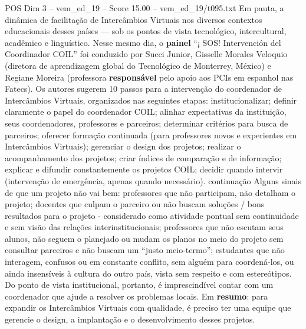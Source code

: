 \begin{textsample}{POS Dim 3 – vem\_ed\_19 – Score 15.00 – vem\_ed\_19/t095.txt}
Em pauta, a dinâmica de facilitação de Intercâmbios Virtuais nos diversos contextos educacionais desses países — sob os pontos de vista tecnológico, intercultural, acadêmico e linguístico.
Nesse mesmo dia, o \textbf{painel} “¡ SOS!
Intervención del Coordinador COIL” foi conduzido por Succi Junior, Gisselle Morales Veloquio (diretora de aprendizagem global do Tecnológico de Monterrey, México) e Regiane Moreira (professora \textbf{responsável} pelo apoio aos PCIs em espanhol nas Fatecs).
Os autores sugerem 10 passos para a intervenção do coordenador de Intercâmbios Virtuais, organizados nas seguintes etapas: institucionalizar; definir claramente o papel do coordenador COIL; alinhar expectativas da instituição, seus coordenadores, professores e parceiros; determinar critérios para busca de parceiros; oferecer formação continuada (para professores novos e experientes em Intercâmbios Virtuais); gerenciar o design dos projetos; realizar o acompanhamento dos projetos; criar índices de comparação e de informação; explicar e difundir constantemente os projetos COIL; decidir quando intervir (intervenção de emergência, apenas quando necessário). continuação Alguns sinais de que um projeto não vai bem: professores que não participam, não detalham o projeto; docentes que culpam o parceiro ou não buscam soluções / bons resultados para o projeto - considerado como atividade pontual sem continuidade e sem visão das relações interinstitucionais; professores que não escutam seus alunos, não seguem o planejado ou mudam os planos no meio do projeto sem consultar parceiros e não buscam um “justo meio-termo”; estudantes que não interagem, confusos ou em constante conflito, sem alguém para coordená-los, ou ainda insensíveis à cultura do outro país, vista sem respeito e com estereótipos.
Do ponto de vista institucional, portanto, é imprescindível contar com um coordenador que ajude a resolver os problemas locais.
Em \textbf{resumo}: para expandir os Intercâmbios Virtuais com qualidade, é preciso ter uma equipe que gerencie o design, a implantação e o desenvolvimento desses projetos.

\end{textsample}
